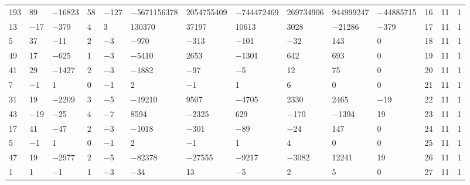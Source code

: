 \documentclass[10pt,a4paper]{amsart}
\numberwithin{equation}{section}
\theoremstyle{definition}
\numberwithin{table}{section}
\begin{document}
{\begin{paracol}{3}
\begin{supertabular}{|w{c}{.32cm}w{c}{.32cm}w{c}{.32cm}@{\hspace{.5cm}}w{c}{.2cm}w{c}{.2cm}|@{\hspace{\tabcolsep}}HHHHHHw{c}{.17cm}w{c}{.17cm}w{c}{.17cm}|}
			193 & 89 & $-$16823 & 58 & $-$127 & $-$5671156378 & 2054755409 & $-$744472469 & 269734906 & 944999247 & $-$44885715 & 16 & 11 & 1 \\
			13 & $-$17 & $-$379 & 4 & 3 & 130370 & 37197 & 10613 & 3028 & $-$21286 & $-$379 & 17 & 11 & 1 \\
			5 & 37 & $-$11 & 2 & $-$3 & $-$970 & $-$313 & $-$101 & $-$32 & 143 & 0 & 18 & 11 & 1 \\
			49 & 17 & $-$625 & 1 & $-$3 & $-$5410 & 2653 & $-$1301 & 642 & 693 & 0 & 19 & 11 & 1 \\
			41 & 29 & $-$1427 & 2 & $-$3 & $-$1882 & $-$97 & $-$5 & 12 & 75 & 0 & 20 & 11 & 1 \\
			7 & $-$1 & 1 & 0 & $-$1 & 2 & $-$1 & 1 & 6 & 0 & 0 & 21 & 11 & 1 \\
			31 & 19 & $-$2209 & 3 & $-$5 & $-$19210 & 9507 & $-$4705 & 2330 & 2465 & $-$19 & 22 & 11 & 1 \\
			43 & $-$19 & $-$25 & 4 & $-$7 & 8594 & $-$2325 & 629 & $-$170 & $-$1394 & 19 & 23 & 11 & 1 \\
			17 & 41 & $-$47 & 2 & $-$3 & $-$1018 & $-$301 & $-$89 & $-$24 & 147 & 0 & 24 & 11 & 1 \\
			5 & $-$1 & 1 & 0 & $-$1 & 2 & $-$1 & 1 & 4 & 0 & 0 & 25 & 11 & 1 \\
			47 & 19 & $-$2977 & 2 & $-$5 & $-$82378 & $-$27555 & $-$9217 & $-$3082 & 12241 & 19 & 26 & 11 & 1 \\
			1 & 1 & $-$1 & 1 & $-$3 & $-$34 & 13 & $-$5 & 2 & 5 & 0 & 27 & 11 & 1 \\ \hline
		\end{supertabular}
	\end{paracol}
	\vspace{-.2cm}
	\label{TA:det=1}
	\vspace{.5cm}
	
}
\end{document}
